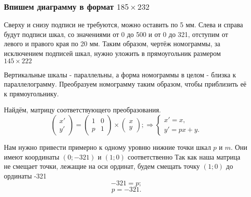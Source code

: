 \subsubsection{Впишем диаграмму в формат $185 \times 232$}

Сверху и снизу подписи не требуются, можно оставить по 5 мм.
Слева и справа будут подписи шкал, со значениями от 0 до 500 и от 0 до 321, отступим от левого и правого края по 20 мм.
Таким образом, чертёж номограммы, за исключением подписей шкал, нужно уложить в прямоугольник размером $145 \times 222$

Вертикальные шкалы - параллельны, а форма номограммы в целом - близка к параллелограмму.
Преобразуем номограмму таким образом, чтобы приблизить её к прямоугольнику.

Найдём, матрицу соответствующего преобразования.
$$
\left(
	\begin{array}{c}
		x' \\
		y'
	\end{array}
\right) 
= 
\left(
	\begin{array}{cc}
		1 & 0 \\
		p & 1
	\end{array}
\right) 
\times 
\left(
	\begin{array}{c}
		x \\
		y
	\end{array}
\right)
;
\Rightarrow
\left\{
	\begin{array}{l}
		x' = x,\\
		y' = px + y.
	\end{array}
\right. 
$$

Нам нужно привести примерно к одному уровню нижние точки шкал $p$ и $m$. 
Они имеют координаты $(0; -321)$ и $(1; 0)$ соответственно
Так как наша матрица не смещает точки, лежащие на оси ординат, будем смещать точку $(1; 0)$ до ординаты -321
$$-321 = p;$$
$$p = -321.$$
